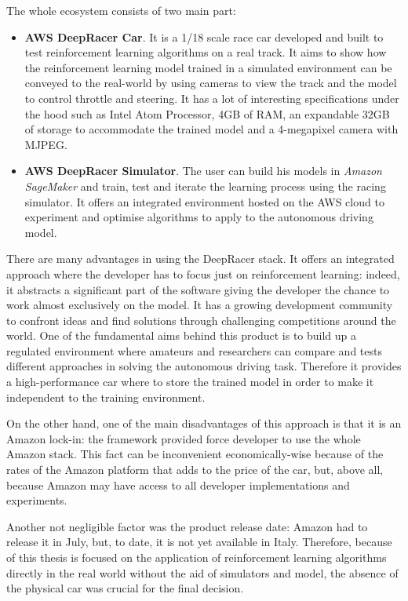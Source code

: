 The whole ecosystem consists of two main part:
\begin{itemize}
\item \textbf{AWS DeepRacer Car}. It is a 1/18 scale race car developed and built to test reinforcement learning algorithms on a real track. It aims to show how the reinforcement learning model trained in a simulated environment can be conveyed to the real-world by using cameras to view the track and the model to control throttle and steering. It has a lot of interesting specifications under the hood such as Intel Atom \textsuperscript{\textregistered} Processor, 4GB of RAM, an expandable 32GB of storage to accommodate the trained model and a 4-megapixel camera with MJPEG.
\item \textbf{AWS DeepRacer Simulator}. The user can build his models in \textit{Amazon SageMaker} and train, test and iterate the learning process using the racing simulator. It offers an integrated environment hosted on the AWS cloud to experiment and optimise algorithms to apply to the autonomous driving model.
\end{itemize}

There are many advantages in using the DeepRacer stack. It offers an integrated approach where the developer has to focus just on reinforcement learning: indeed, it abstracts a significant part of the software giving the developer the chance to work almost exclusively on the model. It has a growing development community to confront ideas and find solutions through challenging competitions around the world. One of the fundamental aims behind this product is to build up a regulated environment where amateurs and researchers can compare and tests different approaches in solving the autonomous driving task. Therefore it provides a high-performance car where to store the trained model in order to make it independent to the training environment.


On the other hand, one of the main disadvantages of this approach is that it is an Amazon lock-in: the framework provided force developer to use the whole Amazon stack. This fact can be inconvenient economically-wise because of the rates of the Amazon platform that adds to the price of the car, but, above all, because Amazon may have access to all developer implementations and experiments. 

Another not negligible factor was the product release date: Amazon had to release it in July, but, to date, it is not yet available in Italy. Therefore, because of this thesis is focused on the application of reinforcement learning algorithms directly in the real world without the aid of simulators and model, the absence of the physical car was crucial for the final decision.

